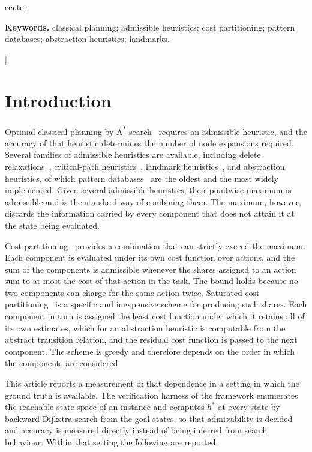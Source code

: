 \documentclass[10pt,twocolumn,a4paper]{article}
\theoremstyle{plain}
\theoremstyle{definition}
\theoremstyle{remark}
\newcommand{\hstar}{h^{*}}
\begin{document}
\begin{@twocolumnfalse}
\begin{adjustbox}{center}
\begin{minipage}{0.86\textwidth}
\vspace{0.7em}
\noindent\textbf{Keywords.} classical planning; admissible heuristics; cost
partitioning; pattern databases; abstraction heuristics; landmarks.
\vspace{1.6em}
\end{minipage}
\end{adjustbox}
\end{@twocolumnfalse}
]

\section{Introduction}
\label{sec:intro}

Optimal classical planning by A\textsuperscript{*} search~\cite{hart1968}
requires an admissible heuristic, and the accuracy of that heuristic determines
the number of node expansions required. Several families of admissible
heuristics are available, including delete relaxations~\cite{bonet2001},
critical-path heuristics~\cite{haslum2000}, landmark
heuristics~\cite{karpas2009}, and abstraction heuristics, of which pattern
databases~\cite{culberson1998,edelkamp2001,haslum2007} are the oldest and the
most widely implemented. Given several admissible heuristics, their pointwise
maximum is admissible and is the standard way of combining them. The maximum,
however, discards the information carried by every component that does not
attain it at the state being evaluated.

Cost partitioning~\cite{katz2008,yang2008,pommerening2015} provides a
combination that can strictly exceed the maximum. Each component is evaluated
under its own cost function over actions, and the sum of the components is
admissible whenever the shares assigned to an action sum to at most the cost of
that action in the task. The bound holds because no two components can charge
for the same action twice. Saturated cost
partitioning~\cite{seipp2014,seipp2020} is a specific and inexpensive scheme
for producing such shares. Each component in turn is assigned the least cost
function under which it retains all of its own estimates, which for an
abstraction heuristic is computable from the abstract transition relation, and
the residual cost function is passed to the next component. The scheme is
greedy and therefore depends on the order in which the components are
considered.

This article reports a measurement of that dependence in a setting in which the
ground truth is available. The verification harness of the framework enumerates
the reachable state space of an instance and computes $\hstar$ at every state by
backward Dijkstra search from the goal states, so that admissibility is decided
and accuracy is measured directly instead of being inferred from search
behaviour. Within that setting the following are reported.
\end{document}
